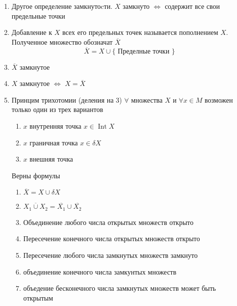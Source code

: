 \documentclass[14pt]{extarticle}
\DeclareMathOperator{\intt}{Int}
\begin{document}
\begin{enumerate}
	\item Другое определение замкнутоcти.  $X$ замкнуто  $\iff$ содержит все свои предельные точки
	\item Добавление к  $X$ всех его предельных точек 
		называется пополнением  $X$. Полученное множество
		обозначат  $\overline{X}$
		 \begin{equation}
			 \overline{X} = X \cup \{\text{~Пределные точки~}\}
		 \end{equation}
	\item $\overline{X}$ замкнутое
	\item $X$ замкнутое  $\iff$  $X = \overline{X}$
	 \item Принцим трихотомии (деления на 3)
		 $\forall $ множества $X$ и  $\forall  x \in M$ 
		 возможен только один из трех вариантов
		 \begin{enumerate}
		 	\item $x$ внутренняя точка $x \in \intt X$
			\item  $x$ граничная точка $x \in \delta X$
			\item  $x$ внешняя точка
		 \end{enumerate}
		Верны формулы
		\begin{enumerate}
			\item $\overline{X} = X \cup \delta X$
			 \item $\overline{X_1 \cup X_2} = \overline{X_1} \cup \overline{X_2}$
		\item Объединение любого числа открытых множеств открыто
		\item Пересечение конечного числа открытых множеств открыто
		\item Пересечение любого числа замкнутых множеств
			замкнуто
		\item объединение конечного числа замкунтых множеств
		\item объедение бесконечного числа замкнутых множеств может быть открытым
		\end{enumerate}
\end{enumerate}
\end{document}
